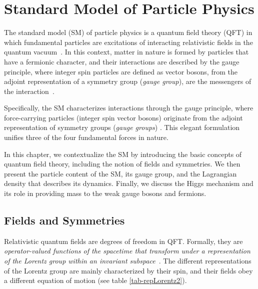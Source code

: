 \chapter{Standard Model of Particle Physics}

The standard model (SM) of particle physics is a quantum field theory (QFT) in which fundamental particles are excitations of interacting relativistic fields in the quantum vacuum~\parencite{greiner2000relativistic}. In this context, matter in nature is formed by particles that have a fermionic character, and their interactions are described by the gauge principle, where integer spin particles are defined as vector bosons, from the adjoint representation of a symmetry group (\textit{gauge group}), are the messengers of the interaction~\parencite{pokorski2000gauge}.

Specifically, the SM characterizes interactions through the gauge principle, where force-carrying particles (integer spin vector bosons) originate from the adjoint representation of symmetry groups (\textit{gauge groups}) \cite{pokorski2000gauge}. This elegant formulation unifies three of the four fundamental forces in nature.

In this chapter, we contextualize the SM by introducing the basic concepts of quantum field theory, including the notion of fields and symmetries. We then present the particle content of the SM, its gauge group, and the Lagrangian density that describes its dynamics. Finally, we discuss the Higgs mechanism and its role in providing mass to the weak gauge bosons and fermions.

\section{Fields and Symmetries}
Relativistic quantum fields are degrees of freedom in QFT. Formally, they are \textit{operator-valued functions of the spacetime that transform under a representation of the Lorentz group within an invariant subspace}~\parencite{Tong1995,CRodriguezUPTC}. The different representations of the Lorentz group are mainly characterized by their spin, and their fields obey a different equation of motion (see table \ref{tab-repLorentz2}). 

